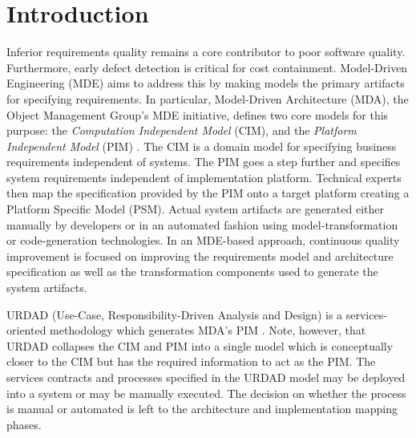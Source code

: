 \section{Introduction}
\label{sec:Introduction}


Inferior requirements quality remains a core contributor to poor software quality\cite{heck_experiences_2008,_strategies_2011}. Furthermore, early defect detection is critical for cost containment\cite{betterReferenceThanBoehm1981WhichReliesOnWaterfall}. Model-Driven Engineering (MDE) \cite{frankel_model_2003} aims to address this by making models the primary artifacts for specifying requirements. In particular, Model-Driven Architecture (MDA), the Object Management Group's MDE initiative, defines two core models for this purpose: the \emph{Computation Independent Model} (CIM), and the \emph{Platform Independent Model} (PIM) \cite{_mda_2003}. The CIM is a domain model for specifying business requirements independent of systems. The PIM goes a step further and specifies system requirements independent of implementation platform. Technical experts then map the specification provided by the PIM onto a target platform creating a {Platform Specific Model} (PSM). Actual system artifacts are generated either manually by developers or in an automated fashion using model-transformation or code-generation technologies. In an MDE-based approach, continuous quality improvement is focused on improving the requirements model and architecture specification as well as the transformation components used to generate the system artifacts.

URDAD (Use-Case, Responsibility-Driven Analysis and Design) \cite{solms_technology_2007} is a services-oriented methodology which generates MDA's PIM \cite{solms_generating_2009}. Note, however, that URDAD collapses the CIM and PIM into a single model which is conceptually closer to the CIM but has the required information to act as the PIM. The services contracts and processes specified in the URDAD model may be deployed into a system or may be manually executed. The decision on whether the process is manual or automated is left to the architecture and implementation mapping phases. 

